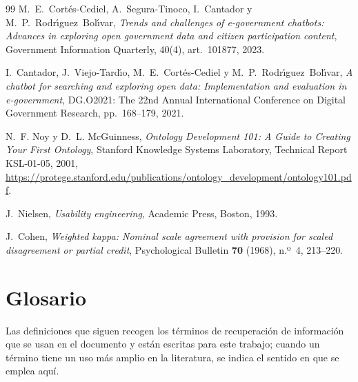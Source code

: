 \documentclass[11pt,letterpaper]{article}
\numberwithin{equation}{section}
\begin{document}
\begin{thebibliography}{99}
M.~E.~Cort{\'e}s-Cediel, A.~Segura-Tinoco, I.~Cantador y M.~P.~Rodr{\'\i}guez~Bol{\'\i}var,
\textit{Trends and challenges of e-government chatbots: Advances in exploring open government data and citizen participation content},
Government Information Quarterly, 40(4), art.~101877, 2023.

I.~Cantador, J.~Viejo-Tard{\'\i}o, M.~E.~Cort{\'e}s-Cediel y M.~P.~Rodr{\'\i}guez~Bol{\'\i}var,
\textit{A chatbot for searching and exploring open data: Implementation and evaluation in e-government},
DG.O2021: The 22nd Annual International Conference on Digital Government Research, pp.~168--179, 2021.

N.~F. Noy y D.~L. McGuinness, \textit{Ontology Development 101: A Guide to Creating Your First Ontology}, Stanford Knowledge Systems Laboratory, Technical Report KSL-01-05, 2001, \url{https://protege.stanford.edu/publications/ontology_development/ontology101.pdf}.

J.~Nielsen,
\textit{Usability engineering},
Academic Press, Boston, 1993.

J.~Cohen,
\textit{Weighted kappa: Nominal scale agreement with provision for scaled disagreement or partial credit},
Psychological Bulletin \textbf{70} (1968), n.º~4, 213--220.

\end{thebibliography}

\clearpage
\appendix
{}

\section{Glosario}
\label{sec:glosario}
Las definiciones que siguen recogen los términos de recuperación de información que se usan en el documento y están escritas para este trabajo; cuando un término tiene un uso más amplio en la literatura, se indica el sentido en que se emplea aquí.
\end{document}
